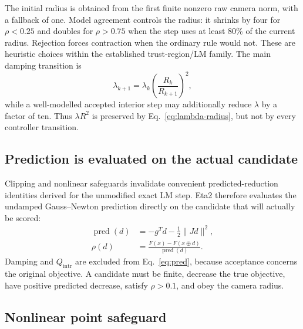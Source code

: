 \documentclass[10pt]{article}
\begin{document}
The initial radius is obtained from the first finite nonzero raw camera norm, with a fallback of one.  Model agreement controls the radius: it shrinks by four for $\rho<0.25$ and doubles for $\rho>0.75$ when the step uses at least 80\% of the current radius.  Rejection forces contraction when the ordinary rule would not.  These are heuristic choices within the established trust-region/LM family\cite{Conn2000,Ceres}.  The main damping transition is
\begin{equation}
  \lambda_{k+1}=\lambda_k\left(\frac{R_k}{R_{k+1}}\right)^2, \label{eq:lambda-radius}
\end{equation}
while a well-modelled accepted interior step may additionally reduce $\lambda$ by a factor of ten.  Thus $\lambda R^2$ is preserved by Eq.~\eqref{eq:lambda-radius}, but not by every controller transition.

\subsection{Prediction is evaluated on the actual candidate}

Clipping and nonlinear safeguards invalidate convenient predicted-reduction identities derived for the unmodified exact LM step.  Eta2 therefore evaluates the undamped Gauss--Newton prediction directly on the candidate that will actually be scored:
\begin{align}
  \operatorname{pred}(d)&=-g^Td-\frac12\lVert Jd\rVert^2,\label{eq:pred}\\
  \rho(d)&=\frac{F(x)-F(x\oplus d)}{\operatorname{pred}(d)}.\label{eq:rho}
\end{align}
Damping and $Q_{\mathrm{intr}}$ are excluded from Eq.~\eqref{eq:pred}, because acceptance concerns the original objective.  A candidate must be finite, decrease the true objective, have positive predicted decrease, satisfy $\rho>0.1$, and obey the camera radius.

\subsection{Nonlinear point safeguard}
\end{document}
